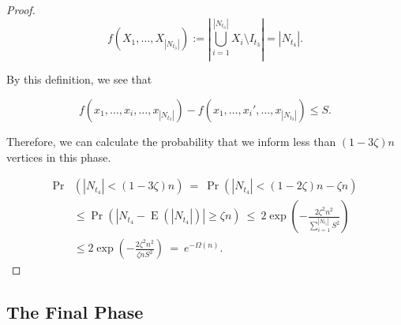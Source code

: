 \documentclass[12pt]{article}
\DeclareMathOperator{\E}{E}
\begin{document}
{\begin{proof}
\begin{equation*}
f(X_1,\dots,X_{|N_{t_3}|}) := \left|\bigcup_{i=1}^{|N_{t_3}|}X_i\setminus I_{t_3}	\right|=|N_{t_4}|.
\end{equation*}


By this definition, we see that

\begin{equation*}
f(x_1,\dots,x_i,\dots,x_{|N_{t_3}|})-f(x_1,\dots,x_i',\dots,x_{|N_{t_3}|})\leq S.
\end{equation*}


Therefore, we can calculate the probability that we inform less than $(1-3\zeta)n$ vertices in this phase.

\begin{align*}
\Pr&\left(|N_{t_4}|<\left(1-3\zeta\right)n\right)\ =\ \Pr\left(|N_{t_4}|<(1-2\zeta)n-\zeta n\right)\\
&\leq \Pr\left(\left|N_{t_4}-\E(|N_{t_4}|)\right|\geq	\zeta n\right)
\ \leq\ 2\exp\left(-\frac{2\zeta^2n^2}{\sum_{i=1}^{|N_{t_3}|}S^2}\right)\\
&\leq 2\exp\left(-\frac{2\zeta^2n^2}{\zeta n S^2}\right)
\ =\ e^{-\Omega(n)}.
\end{align*}
\end{proof}







\subsection{The Final Phase}

}
\end{document}
